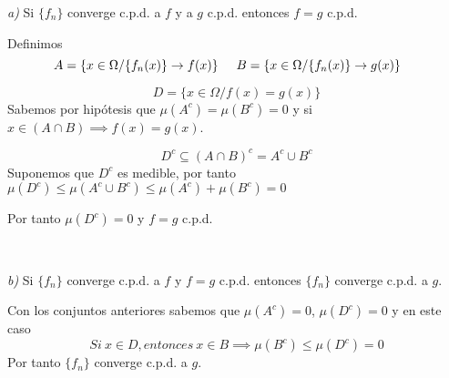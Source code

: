 

\textit{a)}
	Si $\{f_n\}$ converge c.p.d. a $f$ y a $g$ c.p.d. entonces $f=g$ c.p.d. 

Definimos
\[A = \{ x\in\Omega / \{f_n(x)\} \rightarrow f(x) \} \hspace{0.5cm}
  B = \{ x\in\Omega / \{f_n(x)\} \rightarrow g(x) \} \hspace{0.5cm}
\]

\[  D = \{ x\in\Omega / f(x) = g(x) \} 
\]
Sabemos por hipótesis que $\mu (A^c) = \mu (B^c) = 0$ y si $x\in (A\cap B) \implies f(x) = g(x)$.

\[D^c \subseteq (A\cap B)^c = A^c \cup B^c \]
Suponemos que $D^c$ es medible, por tanto
$\mu (D^c) \leq \mu (A^c \cup B^c) \leq \mu(A^c) + \mu (B^c) = 0$

Por tanto $\mu (D^c)=0$ y $f=g$ c.p.d. 

{\ } 
 
\textit{b)}
	Si $\{f_n\}$ converge c.p.d. a $f$ y $f=g$ c.p.d. entonces $\{f_n\}$ converge c.p.d. a $g$.
	
Con los conjuntos anteriores sabemos que $\mu (A^c) = 0$, $\mu (D^c) = 0$ y en este caso
\[Si \ x\in D, entonces \ x\in B \implies \mu (B^c) \leq \mu (D^c) = 0\]
Por tanto $\{f_n\}$ converge c.p.d. a $g$.

